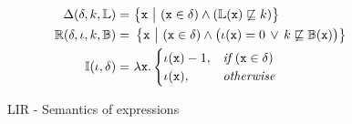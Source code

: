 \begin{figure}[!htbp]
\begin{framed}
\begin{flushleft}
\begin{align*}
\Delta(\delta, k, \mathbb{L}) =&~ \big\{\texttt{x}~\big|~(\texttt{x} \in \delta) \wedge
                            (\mathbb{L}(\texttt{x}) \not\sqsubseteq k) \big\} \\
\mathbb{R}(\delta, \iota, k, \mathbb{B}) =&~ \left\{\texttt{x}~\middle|~(\texttt{x} \in \delta) \wedge \big(\iota(\texttt{x})
= 0 \, \vee \, k \not\sqsubseteq \mathbb{B}(\texttt{x})\big)\right\} \\
\mathbb{I}(\iota, \delta) =&~\lambda {\texttt{x}}. 
\begin{cases}
\iota({\texttt{x}}) - 1, &\textit{if} ~ ({\texttt{x}} \in \delta) \\
\iota({\texttt{x}}), &\textit{otherwise}
\end{cases}
\end{align*}
\end{flushleft}
\end{framed}
\caption{LIR - Semantics of expressions}
\label{fig:lir:sem-e}
\end{figure}


